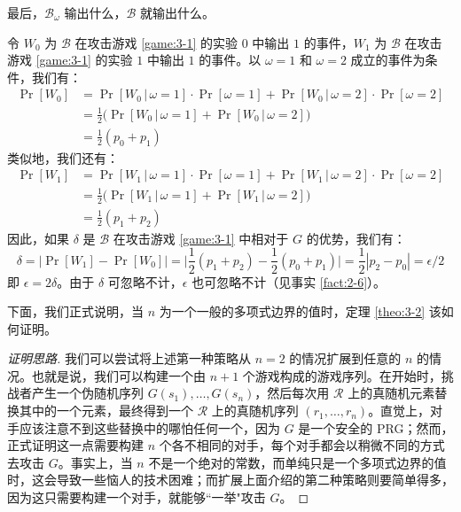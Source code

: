\vspace*{5pt}

\hspace*{5pt} 最后，$\mathcal B_\omega$ 输出什么，$\mathcal B$ 就输出什么。

\vspace*{10pt}

令 $W_0$ 为 $\mathcal B$ 在攻击游戏 \ref{game:3-1} 的实验 $0$ 中输出 $1$ 的事件，$W_1$ 为 $\mathcal B$ 在攻击游戏 \ref{game:3-1} 的实验 $1$ 中输出 $1$ 的事件。以 $\omega=1$ 和 $\omega=2$ 成立的事件为条件，我们有：
\[
\begin{aligned}
\Pr[W_0]
&=\Pr[W_0\,|\,\omega=1]\cdot\Pr[\omega=1]+\Pr[W_0\,|\,\omega=2]\cdot\Pr[\omega=2]\\
&=\frac{1}{2}\Big(\Pr[W_0\,|\,\omega=1]+\Pr[W_0\,|\,\omega=2]\Big)\\
&=\frac{1}{2}(p_0+p_1)
\end{aligned}
\]
类似地，我们还有：
\[
\begin{aligned}
\Pr[W_1]
&=\Pr[W_1\,|\,\omega=1]\cdot\Pr[\omega=1]+\Pr[W_1\,|\,\omega=2]\cdot\Pr[\omega=2]\\
&=\frac{1}{2}\Big(\Pr[W_1\,|\,\omega=1]+\Pr[W_1\,|\,\omega=2]\Big)\\
&=\frac{1}{2}(p_1+p_2)
\end{aligned}
\]
因此，如果 $\delta$ 是 $\mathcal B$ 在攻击游戏 \ref{game:3-1} 中相对于 $G$ 的优势，我们有：
\[
\delta
=\big\lvert
\Pr[W_1]-\Pr[W_0]
\big\rvert
=\bigg\lvert
\frac{1}{2}(p_1+p_2)-\frac{1}{2}(p_0+p_1)
\bigg\lvert
=\frac{1}{2}|p_2-p_0|
={\epsilon}/{2}
\]
即 $\epsilon=2\delta$。由于 $\delta$ 可忽略不计，$\epsilon$ 也可忽略不计（见事实 \ref{fact:2-6}）。

下面，我们正式说明，当 $n$ 为一个一般的多项式边界的值时，定理 \ref{theo:3-2} 该如何证明。

\begin{proof}[证明思路]
我们可以尝试将上述第一种策略从 $n=2$ 的情况扩展到任意的 $n$ 的情况。也就是说，我们可以构建一个由 $n+1$ 个游戏构成的游戏序列。在开始时，挑战者产生一个伪随机序列 $G(s_1),\dots,G(s_n)$，然后每次用 $\mathcal R$ 上的真随机元素替换其中的一个元素，最终得到一个 $\mathcal R$ 上的真随机序列 $(r_1,\dots,r_n)$。直觉上，对手应该注意不到这些替换中的哪怕任何一个，因为 $G$ 是一个安全的 PRG；然而，正式证明这一点需要构建 $n$ 个各不相同的对手，每个对手都会以稍微不同的方式去攻击 $G$。事实上，当 $n$ 不是一个绝对的常数，而单纯只是一个多项式边界的值时，这会导致一些恼人的技术困难；而扩展上面介绍的第二种策略则要简单得多，因为这只需要构建一个对手，就能够``一举"攻击 $G$。
\end{proof}

